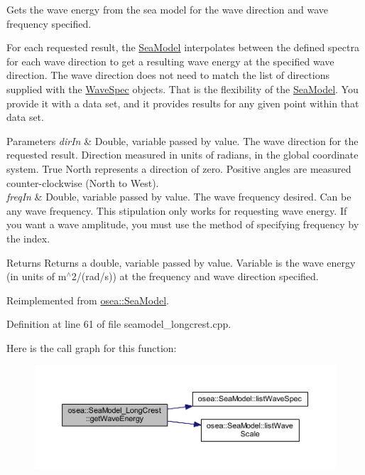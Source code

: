 Gets the wave energy from the sea model for the wave direction and wave frequency specified. 

For each requested result, the \hyperlink{classosea_1_1_sea_model}{Sea\-Model} interpolates between the defined spectra for each wave direction to get a resulting wave energy at the specified wave direction. The wave direction does not need to match the list of directions supplied with the \hyperlink{classosea_1_1_wave_spec}{Wave\-Spec} objects. That is the flexibility of the \hyperlink{classosea_1_1_sea_model}{Sea\-Model}. You provide it with a data set, and it provides results for any given point within that data set. 
\begin{DoxyParams}{Parameters}
{\em dir\-In} & Double, variable passed by value. The wave direction for the requested result. Direction measured in units of radians, in the global coordinate system. True North represents a direction of zero. Positive angles are measured counter-\/clockwise (North to West). \\
\hline
{\em freq\-In} & Double, variable passed by value. The wave frequency desired. Can be any wave frequency. This stipulation only works for requesting wave energy. If you want a wave amplitude, you must use the method of specifying frequency by the index. \\
\hline
\end{DoxyParams}
\begin{DoxyReturn}{Returns}
Returns a double, variable passed by value. Variable is the wave energy (in units of m$^\wedge$2/(rad/s)) at the frequency and wave direction specified. 
\end{DoxyReturn}


Reimplemented from \hyperlink{classosea_1_1_sea_model_abd444caa08206c2f3b2002e614f0b2fc}{osea\-::\-Sea\-Model}.



Definition at line 61 of file seamodel\-\_\-longcrest.\-cpp.



Here is the call graph for this function\-:
\nopagebreak
\begin{figure}[H]
\begin{center}
\leavevmode
\includegraphics[width=350pt]{classosea_1_1_sea_model___long_crest_a293fc13033349b9182c6dda3ce8cfe1f_cgraph}
\end{center}
\end{figure}




